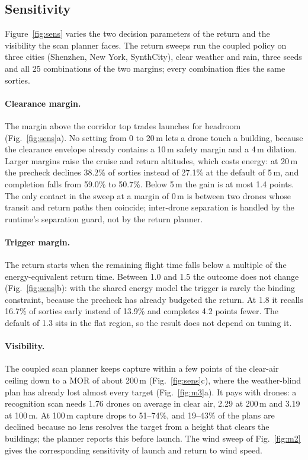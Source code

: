 \subsection{Sensitivity}\label{sec:eval:sens}

Figure~\ref{fig:sens} varies the two decision parameters of the return and the visibility the scan planner faces. The
return sweeps run the coupled policy on three cities (Shenzhen, New York, SynthCity), clear weather and rain, three
seeds and all 25 combinations of the two margins; every combination flies the same sorties.

\paragraph{Clearance margin.} The margin above the corridor top trades launches for headroom
(Fig.~\ref{fig:sens}a). No setting from 0 to 20\,m lets a drone touch a building, because the clearance envelope
already contains a 10\,m safety margin and a 4\,m dilation. Larger margins raise the cruise and return altitudes,
which costs energy: at 20\,m the precheck declines 38.2\% of sorties instead of 27.1\% at the default of 5\,m, and
completion falls from 59.0\% to 50.7\%. Below 5\,m the gain is at most 1.4 points. The only contact in the sweep at a
margin of 0\,m is between two drones whose transit and return paths then coincide; inter-drone separation is handled by
the runtime's separation guard, not by the return planner.

\paragraph{Trigger margin.} The return starts when the remaining flight time falls below a multiple of the
energy-equivalent return time. Between 1.0 and 1.5 the outcome does not change (Fig.~\ref{fig:sens}b): with the shared
energy model the trigger is rarely the binding constraint, because the precheck has already budgeted the return. At 1.8
it recalls 16.7\% of sorties early instead of 13.9\% and completes 4.2 points fewer. The default of 1.3 sits in the flat
region, so the result does not depend on tuning it.

\paragraph{Visibility.} The coupled scan planner keeps capture within a few points of the clear-air ceiling down to a
MOR of about 200\,m (Fig.~\ref{fig:sens}c), where the weather-blind plan has already lost almost every target
(Fig.~\ref{fig:m3}a). It pays with drones: a recognition scan needs 1.76 drones on average in clear air, 2.29 at
200\,m and 3.19 at 100\,m. At 100\,m capture drops to 51--74\%, and 19--43\% of the plans are declined because no
lens resolves the target from a height that clears the buildings; the planner reports this before launch. The wind
sweep of Fig.~\ref{fig:m2} gives the corresponding sensitivity of launch and return to wind speed.

